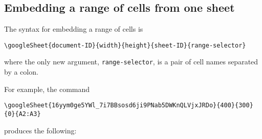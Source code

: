 \documentclass{ximera}
\begin{document}
\subsection{Embedding a range of cells from one sheet}

The syntax for embedding a range of cells is
\begin{verbatim}
\googleSheet{document-ID}{width}{height}{sheet-ID}{range-selector}
\end{verbatim}
where the only new argument, \texttt{range-selector}, is a pair of cell names separated by a colon.

For example, the command
\begin{verbatim}
\googleSheet{16yym0ge5YWl_7i7BBsosd6ji9PNab5DWKnQLVjxJRDo}{400}{300}{0}{A2:A3}
\end{verbatim}
produces the following:
\end{document}
